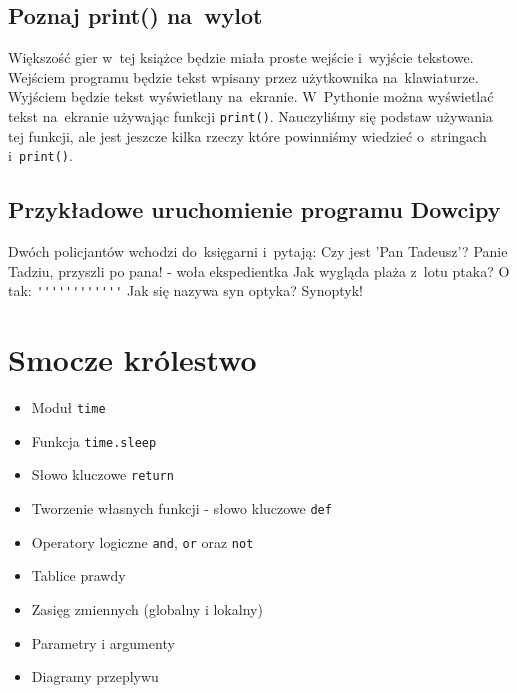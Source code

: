 \documentclass{book}
\newcommand{\btopicscovered}{
	\begin{graybox}
	\begin{itemize}
}
\newcommand{\etopicscovered}{
	\end{itemize}
	\end{graybox}
}
\begin{document}
\section{Poznaj print() na~wylot}

Większość gier w~tej książce będzie miała proste wejście i~wyjście tekstowe. Wejściem programu będzie tekst wpisany przez użytkownika na~klawiaturze. Wyjściem będzie tekst wyświetlany na~ekranie. W~Pythonie można wyświetlać tekst na~ekranie używając funkcji \lstinline{print()}. Nauczyliśmy się podstaw używania tej funkcji, ale jest jeszcze kilka rzeczy które powinniśmy wiedzieć o~stringach i~\lstinline{print()}.

\section{Przykładowe uruchomienie programu Dowcipy}

\begin{pseudolisting}
Dwóch policjantów wchodzi do~księgarni i~pytają:\linebreak
Czy jest 'Pan Tadeusz'?\linebreak
\linebreak
Panie Tadziu, przyszli po pana! - woła ekspedientka\linebreak
\linebreak
Jak wygląda plaża z~lotu ptaka?\linebreak
\linebreak
O tak: \lstinline{''''''''''''}\linebreak
\linebreak
Jak się nazywa syn optyka?\linebreak
\linebreak
Synoptyk!\linebreak
\end{pseudolisting}


\chapter{Smocze królestwo}
\btopicscovered
	\item Moduł \lstinline{time}
	\item Funkcja \lstinline{time.sleep}
	\item Słowo kluczowe \lstinline{return}
	\item Tworzenie własnych funkcji - słowo kluczowe \lstinline{def}
	\item Operatory logiczne \lstinline{and}, \lstinline{or} oraz \lstinline{not}
	\item Tablice prawdy
	\item Zasięg zmiennych (globalny i lokalny)
	\item Parametry i argumenty
	\item Diagramy przeplywu %
\etopicscovered
\end{document}
